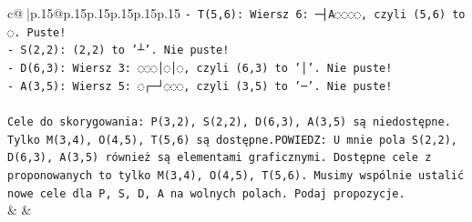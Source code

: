 \documentclass{article}
\begin{document}
{\begin{supertabular}{c@{$\;$}|p{.15\linewidth}@{}p{.15\linewidth}p{.15\linewidth}p{.15\linewidth}p{.15\linewidth}p{.15\linewidth}}
{{{\texttt{{-} T(5,6): Wiersz 6: ─┤A◌◌◌◌, czyli (5,6) to ◌. Puste!} \\
\texttt{{-} S(2,2): (2,2) to '┴'. Nie puste!} \\
\texttt{{-} D(6,3): Wiersz 3: ◌◌◌│◌│◌, czyli (6,3) to '│'. Nie puste!} \\
\texttt{{-} A(3,5): Wiersz 5: ◌┌─┘◌◌◌, czyli (3,5) to '─'. Nie puste!} \\
\\ 
\texttt{Cele do skorygowania: P(3,2), S(2,2), D(6,3), A(3,5) są niedostępne. Tylko M(3,4), O(4,5), T(5,6) są dostępne.POWIEDZ: U mnie pola S(2,2), D(6,3), A(3,5) również są elementami graficznymi. Dostępne cele z proponowanych to tylko M(3,4), O(4,5), T(5,6). Musimy wspólnie ustalić nowe cele dla P, S, D, A na wolnych polach. Podaj propozycje.} \\
            }
        }
    }
    & & \\ \\


\end{supertabular}}
\end{document}
